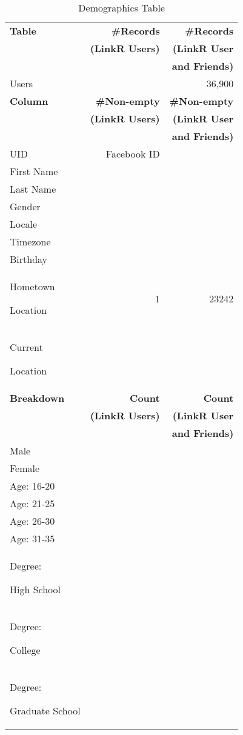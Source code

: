 \documentclass[letterpaper]{article}
\begin{document}
\begin{table}[h!]
\centering
\caption{\small Demographics Table}
\label{tab:demographics}
\begin{tabular}{|>{\small}p{2cm}|>{\small}r|>{\small}r|}
\hline
\textbf{Table} & \textbf{\#Records} & \textbf{\#Records} \\
& \textbf{(LinkR Users)} & \textbf{(LinkR User} \\
& & \textbf{and Friends)} \\
\hline
Users &  & 36,900 \\
\hline
\hline
\textbf{Column} & \textbf{\#Non-empty} & \textbf{\#Non-empty} \\
& \textbf{(LinkR Users)} & \textbf{(LinkR User} \\
& & \textbf{and Friends)} \\
\hline
UID & Facebook ID & \\
\hline
First Name & & \\
\hline
Last Name & & \\
\hline
Gender & & \\
\hline
Locale & & \\
\hline
Timezone & & \\
\hline
Birthday & & \\
\hline
Hometown\par Location & 1 & 23242 \\
\hline
Current\par Location & & \\
\hline
\hline
\textbf{Breakdown} & \textbf{Count} & \textbf{Count} \\
& \textbf{(LinkR Users)} & \textbf{(LinkR User} \\
& & \textbf{and Friends)} \\
\hline
Male & & \\
\hline
Female & & \\
\hline
Age: 16-20 & & \\
\hline
Age: 21-25 & & \\
\hline
Age: 26-30 & & \\
\hline
Age: 31-35 & & \\
\hline
Degree:\par High School & & \\
\hline
Degree:\par College & & \\
\hline
Degree:\par Graduate School & & \\
\hline
\end{tabular}
\end{table}
\end{document}
